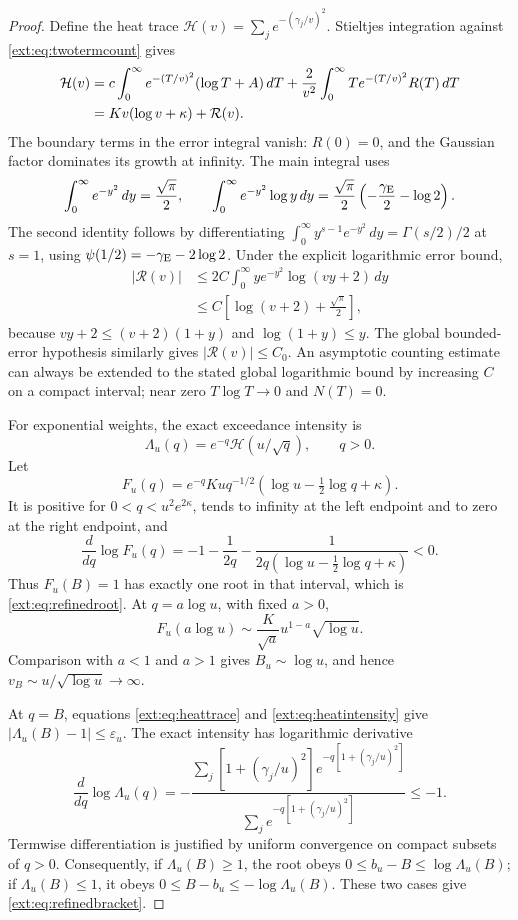 \documentclass[11pt]{article}
\theoremstyle{definition}
\theoremstyle{remark}
\begin{document}
\begin{proof}
Define the heat trace
$\mathcal H(v)=\sum_j e^{-(\gamma_j/v)^2}$.
Stieltjes integration against \eqref{ext:eq:twotermcount} gives
\begin{align}
 \mathcal H(v)
 &=c\int_0^\infty e^{-(T/v)^2}(\log T+A)\,dT
       +\frac2{v^2}\int_0^\infty
          T e^{-(T/v)^2}R(T)\,dT\notag\\
 &=Kv(\log v+\kappa)+\mathcal R(v).
 \label{ext:eq:heattrace}
\end{align}
The boundary terms in the error integral vanish: $R(0)=0$, and the
Gaussian factor dominates its growth at infinity.  The main integral
uses
\[
 \int_0^\infty e^{-y^2}\,dy=\frac{\sqrt\pi}{2},\qquad
 \int_0^\infty e^{-y^2}\log y\,dy
    =\frac{\sqrt\pi}{2}
          \left(-\frac{\gamma_{\rm E}}2-\log2\right).
\]
The second identity follows by differentiating
$\int_0^\infty y^{s-1}e^{-y^2}\,dy=\Gamma(s/2)/2$ at $s=1$,
using $\psi(1/2)=-\gamma_{\rm E}-2\log2$.
Under the explicit logarithmic error bound,
\begin{align*}
 |\mathcal R(v)|
 &\le2C\int_0^\infty y e^{-y^2}\log(vy+2)\,dy\\
 &\le C\left[\log(v+2)+\frac{\sqrt\pi}{2}\right],
\end{align*}
because $vy+2\le(v+2)(1+y)$ and $\log(1+y)\le y$.
The global bounded-error hypothesis similarly gives
$|\mathcal R(v)|\le C_0$.
An asymptotic counting estimate can always be extended to the stated
global logarithmic bound by increasing $C$ on a compact interval;
near zero $T\log T\to0$ and $N(T)=0$.

For exponential weights, the exact exceedance intensity is
\begin{equation}\label{ext:eq:heatintensity}
 \Lambda_u(q)=e^{-q}\mathcal H(u/\sqrt q),\qquad q>0.
\end{equation}
Let
\[
 F_u(q)=e^{-q}Ku q^{-1/2}
             (\log u-\tfrac12\log q+\kappa).
\]
It is positive for $0<q<u^2e^{2\kappa}$, tends to infinity at the
left endpoint and to zero at the right endpoint, and
\[
 \frac{d}{dq}\log F_u(q)
   =-1-\frac1{2q}
       -\frac1{2q(\log u-\tfrac12\log q+\kappa)}<0.
\]
Thus $F_u(B)=1$ has exactly one root in that interval, which is
\eqref{ext:eq:refinedroot}.  At $q=a\log u$, with fixed $a>0$,
\[
 F_u(a\log u)
   \sim\frac K{\sqrt a}
          u^{1-a}\sqrt{\log u}.
\]
Comparison with $a<1$ and $a>1$ gives $B_u\sim\log u$, and hence
$v_B\sim u/\sqrt{\log u}\to\infty$.

At $q=B$, equations \eqref{ext:eq:heattrace} and
\eqref{ext:eq:heatintensity} give
$|\Lambda_u(B)-1|\le\varepsilon_u$.
The exact intensity has logarithmic derivative
\begin{equation}\label{ext:eq:intensityslope}
 \frac{d}{dq}\log\Lambda_u(q)
  =-\frac{\sum_j[1+(\gamma_j/u)^2]
            e^{-q[1+(\gamma_j/u)^2]}}
          {\sum_j e^{-q[1+(\gamma_j/u)^2]}}
  \le-1.
\end{equation}
Termwise differentiation is justified by uniform convergence on
compact subsets of $q>0$.
Consequently, if $\Lambda_u(B)\ge1$, the root obeys
$0\le b_u-B\le\log\Lambda_u(B)$; if $\Lambda_u(B)\le1$, it obeys
$0\le B-b_u\le-\log\Lambda_u(B)$.
These two cases give \eqref{ext:eq:refinedbracket}.


\end{proof}
\end{document}
